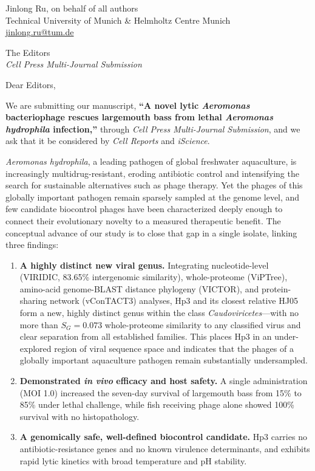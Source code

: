 \documentclass[11pt,a4paper]{article}
\begin{document}
\noindent Jinlong Ru, on behalf of all authors\\
Technical University of Munich \& Helmholtz Centre Munich\\
\href{mailto:jinlong.ru@tum.de}{jinlong.ru@tum.de}

\bigskip
\noindent The Editors\\
\emph{Cell Press Multi-Journal Submission}

\bigskip
\noindent Dear Editors,

We are submitting our manuscript, \textbf{``A novel lytic \emph{Aeromonas}
bacteriophage rescues largemouth bass from lethal \emph{Aeromonas hydrophila}
infection,''} through \emph{Cell Press Multi-Journal Submission}, and we ask
that it be considered by \emph{Cell Reports} and \emph{iScience}.

\emph{Aeromonas hydrophila}, a leading pathogen of global freshwater
aquaculture, is increasingly multidrug-resistant, eroding antibiotic control
and intensifying the search for sustainable alternatives such as phage therapy.
Yet the phages of this globally important pathogen remain sparsely sampled at
the genome level, and few candidate biocontrol phages have been characterized
deeply enough to connect their evolutionary novelty to a measured therapeutic
benefit. The conceptual advance of our study is to close that gap in a single
isolate, linking three findings:

\begin{enumerate}
\item \textbf{A highly distinct new viral genus.} Integrating nucleotide-level
(VIRIDIC, 83.65\% intergenomic similarity), whole-proteome (ViPTree),
amino-acid genome-BLAST distance phylogeny (VICTOR), and protein-sharing
network (vConTACT3) analyses, Hp3 and its closest relative HJ05 form a new,
highly distinct genus within the class \emph{Caudoviricetes}---with no more
than $S_G = 0.073$ whole-proteome similarity to any classified virus and clear
separation from all established families. This places Hp3 in an under-explored
region of viral sequence space and indicates that the phages of a globally
important aquaculture pathogen remain substantially undersampled.

\item \textbf{Demonstrated \emph{in vivo} efficacy and host safety.} A single
administration (MOI 1.0) increased the seven-day survival of largemouth bass
from 15\% to 85\% under lethal challenge, while fish receiving phage alone
showed 100\% survival with no histopathology.

\item \textbf{A genomically safe, well-defined biocontrol candidate.} Hp3
carries no antibiotic-resistance genes and no known virulence
determinants, and exhibits rapid lytic kinetics with broad temperature and pH
stability.

\end{enumerate}
\end{document}
